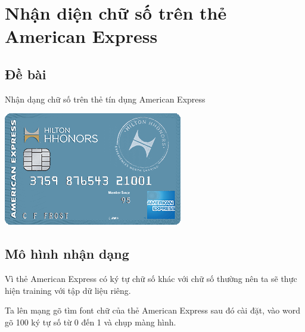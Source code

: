 \section{Nhận diện chữ số trên thẻ American Express}

\subsection{Đề bài}
Nhận dạng chữ số trên thẻ tín dụng American Express
\begin{center}
    \includegraphics[scale = 1]{images/americanexpress/inputAmericanExpress}
\end{center}

\subsection{Mô hình nhận dạng}

\quad Vì thẻ American Express có ký tự chữ số khác với chữ số thường nên ta sẽ thực
hiện training với tập dữ liệu riêng.

    \quad Ta lên mạng gõ tìm font chữ của thẻ American Express sau đó cài đặt, vào word
gõ 100 ký tự số từ 0 đến 1 và chụp màng hình. 

